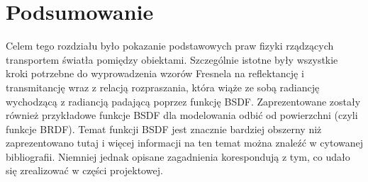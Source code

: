 \section{Podsumowanie}
Celem tego rozdziału było pokazanie podstawowych praw fizyki rządzących transportem światła pomiędzy obiektami. Szczególnie istotne były wszystkie kroki potrzebne do wyprowadzenia wzorów Fresnela na reflektancję i transmitancję wraz z relacją rozpraszania, która wiąże ze sobą radiancję wychodzącą z radiancją padającą poprzez funkcję BSDF. Zaprezentowane zostały również przykładowe funkcje BSDF dla modelowania odbić od powierzchni (czyli funkcje BRDF). Temat funkcji BSDF jest znacznie bardziej obszerny niż zaprezentowano tutaj i więcej informacji na ten temat można znaleźć w cytowanej bibliografii. Niemniej jednak opisane zagadnienia korespondują z tym, co udało się zrealizować w części projektowej.

